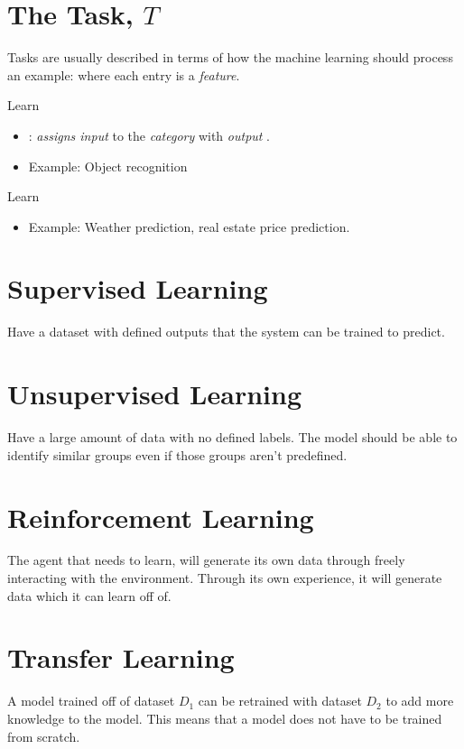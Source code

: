\documentclass[
	number={1},
	title={Machine Learning Fundamentals}
]{cs584notes}
\begin{document}
\section{The Task, $T$}\label{sec:the-task}
Tasks are usually described in terms of how the machine learning should process an example:  where each entry  is a \emph{feature}.
\begin{description}[font=\color{emphblue}]
	\item[Classification:] Learn 
	\begin{itemize}
		\item {}: \emph{assigns input} to the \emph{category} with \emph{output} .
		\item Example: Object recognition
	\end{itemize}
	\item[Regression:] Learn 
	\begin{itemize}
		\item Example: Weather prediction, real estate price prediction.
	\end{itemize}
\end{description}

\section{Supervised Learning}\label{sec:supervised-learning}
Have a dataset with defined outputs that the system can be trained to predict.

\section{Unsupervised Learning}\label{sec:unsupervised-learning}
Have a large amount of data with no defined labels.
The model should be able to identify similar groups even if those groups aren't predefined.

\section{Reinforcement Learning}\label{sec:reinforcement-learning}
The agent that needs to learn, will generate its own data through freely interacting with the environment.
Through its own experience, it will generate data which it can learn off of.

\section{Transfer Learning}\label{sec:transfer-learning}
A model trained off of dataset $D_{1}$ can be retrained with dataset $D_{2}$ to add more knowledge to the model.
This means that a model does not have to be trained from scratch.
\end{document}
